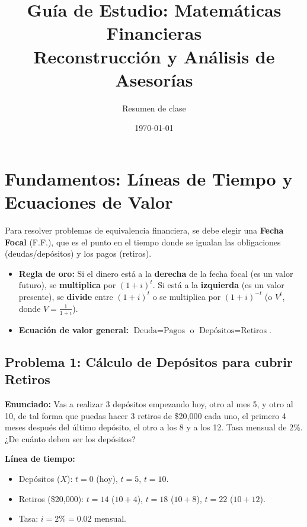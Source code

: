 \documentclass[12pt,a4paper]{article}
\title{\textbf{Guía de Estudio: Matemáticas Financieras}\\ \large Reconstrucción y Análisis de Asesorías}
\author{Resumen de clase}
\date{\today}
\begin{document}
\maketitle
\tableofcontents
\newpage

\section{Fundamentos: Líneas de Tiempo y Ecuaciones de Valor}

\begin{tcolorbox}[colback=azulpizarra!5!white, colframe=azulpizarra, title=Reglas de la Línea de Tiempo y Fecha Focal]
Para resolver problemas de equivalencia financiera, se debe elegir una \textbf{Fecha Focal} (F.F.), que es el punto en el tiempo donde se igualan las obligaciones (deudas/depósitos) y los pagos (retiros).
\begin{itemize}
    \item \textbf{Regla de oro:} Si el dinero está a la \textbf{derecha} de la fecha focal (es un valor futuro), se \textbf{multiplica} por \((1+i)^t\). Si está a la \textbf{izquierda} (es un valor presente), se \textbf{divide} entre \((1+i)^t\) o se multiplica por \((1+i)^{-t}\) (o \(V^t\), donde \(V = \frac{1}{1+i}\)).
    \item \textbf{Ecuación de valor general:} \(\text{Deuda} = \text{Pagos}\) o \(\text{Depósitos} = \text{Retiros}\).
\end{itemize}
\end{tcolorbox}

\subsection*{Problema 1: Cálculo de Depósitos para cubrir Retiros}
\textbf{Enunciado:} Vas a realizar 3 depósitos empezando hoy, otro al mes 5, y otro al 10, de tal forma que puedas hacer 3 retiros de \$20,000 cada uno, el primero 4 meses después del último depósito, el otro a los 8 y a los 12. Tasa mensual de 2\%. ¿De cuánto deben ser los depósitos?

\textbf{Línea de tiempo:}
\begin{itemize}
    \item Depósitos (\(X\)): \(t=0\) (hoy), \(t=5\), \(t=10\).
    \item Retiros (\$20,000): \(t=14\) (\(10+4\)), \(t=18\) (\(10+8\)), \(t=22\) (\(10+12\)).
    \item Tasa: \(i = 2\% = 0.02\) mensual.
\end{itemize}
\end{document}
